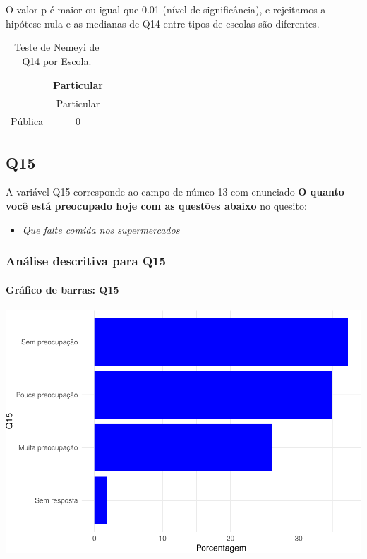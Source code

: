\documentclass[]{article}
\providecommand{\tightlist}{%
  \setlength{\itemsep}{0pt}\setlength{\parskip}{0pt}}
\let\oldparagraph\paragraph
\renewcommand{\paragraph}[1]{\oldparagraph{#1}\mbox{}}
\begin{document}
O valor-p é maior ou igual que 0.01 (nível de significância), e rejeitamos a hipótese nula e as medianas de Q14 entre tipos de escolas são diferentes.

\begin{longtable}[]{@{}lc@{}}
\caption{\label{tab:unnamed-chunk-62}Teste de Nemeyi de Q14 por Escola.}\tabularnewline
\toprule
& Particular\tabularnewline
\midrule
\endfirsthead
\toprule
& Particular\tabularnewline
\midrule
\endhead
Pública & 0\tabularnewline
\bottomrule
\end{longtable}

\cleardoublepage

\hypertarget{q15}{%
\subsection{Q15}\label{q15}}

A variável Q15 corresponde ao campo de númeo 13 com enunciado \textbf{O quanto você está preocupado hoje com as questões abaixo} no quesito:

\begin{itemize}
\tightlist
\item
  \emph{Que falte comida nos supermercados}
\end{itemize}

\hypertarget{anuxe1lise-descritiva-para-q15}{%
\subsubsection{Análise descritiva para Q15}\label{anuxe1lise-descritiva-para-q15}}

\hypertarget{gruxe1fico-de-barras-q15}{%
\paragraph{Gráfico de barras: Q15}\label{gruxe1fico-de-barras-q15}}

\begin{center}\includegraphics[width=0.75\linewidth]{relatorio_covid19_files/figure-latex/unnamed-chunk-69-1} \end{center}
\end{document}
